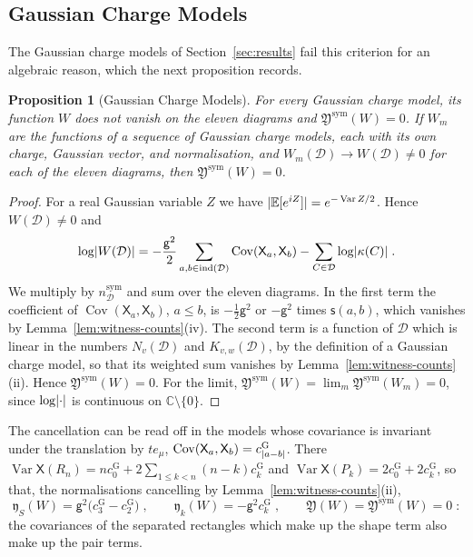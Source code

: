 \documentclass[11pt]{preprint}
\DeclarePairedDelimiter{\abs}{\lvert}{\rvert}
\numberwithin{equation}{section}
\newtheorem{proposition}[theorem]{Proposition}
\theoremstyle{definition}
\theoremstyle{remark}
\theoremstyle{plain}
\begin{document}
\subsection{Gaussian Charge Models}\label{sec:gaussian-models}

The Gaussian charge models of Section~\ref{sec:results} fail this criterion for an algebraic reason, which the next proposition records.

\begin{proposition}[Gaussian Charge Models]\label{prop:gaussian-models}
For every Gaussian charge model, its function $W$ does not vanish on the eleven diagrams and $\mathfrak Y^{\mathrm{sym}}(W) = 0$. If $W_m$ are the functions of a sequence of Gaussian charge models, each with its own charge, Gaussian vector, and normalisation, and $W_m(\mathcal D) \to W(\mathcal D) \neq 0$ for each of the eleven diagrams, then $\mathfrak Y^{\mathrm{sym}}(W) = 0$.
\end{proposition}

\begin{proof}
For a real Gaussian variable $Z$ we have $\abs{\mathbb E[e^{iZ}]} = e^{-\operatorname{Var}Z/2}$. Hence $W(\mathcal D) \neq 0$ and
\begin{equation}\label{eq:gaussian-log}
    \log\abs{W(\mathcal D)} = -\frac{\mathsf g^2}{2}\sum_{a,b \in \operatorname{ind}(\mathcal D)}\operatorname{Cov}(\mathsf X_a, \mathsf X_b) - \sum_{C \in \mathcal D}\log\abs{\kappa(C)}\;.
\end{equation}
We multiply by $n^{\mathrm{sym}}_{\mathcal D}$ and sum over the eleven diagrams. In the first term the coefficient of $\operatorname{Cov}(\mathsf X_a, \mathsf X_b)$, $a \leq b$, is $-\frac12\mathsf g^2$ or $-\mathsf g^2$ times $\mathsf s(a, b)$, which vanishes by Lemma~\ref{lem:witness-counts}(iv). The second term is a function of $\mathcal D$ which is linear in the numbers $N_v(\mathcal D)$ and $K_{v,w}(\mathcal D)$, by the definition of a Gaussian charge model, so that its weighted sum vanishes by Lemma~\ref{lem:witness-counts}(ii). Hence $\mathfrak Y^{\mathrm{sym}}(W) = 0$. For the limit, $\mathfrak Y^{\mathrm{sym}}(W) = \lim_m\mathfrak Y^{\mathrm{sym}}(W_m) = 0$, since $\log\abs{\cdot}$ is continuous on $\mathbb C \setminus \{ 0 \}$.
\end{proof}

The cancellation can be read off in the models whose covariance is invariant under the translation by $te_\mu$, $\operatorname{Cov}(\mathsf X_a, \mathsf X_b) = c^{\mathrm G}_{\abs{a-b}}$. There $\operatorname{Var}\mathsf X(R_n) = nc^{\mathrm G}_0 + 2\sum_{1 \leq k < n}(n - k)c^{\mathrm G}_k$ and $\operatorname{Var}\mathsf X(P_k) = 2c^{\mathrm G}_0 + 2c^{\mathrm G}_k$, so that, the normalisations cancelling by Lemma~\ref{lem:witness-counts}(ii),
\begin{equation}\label{eq:stationary-gaussian}
    \mathfrak y_S(W) = \mathsf g^2\bigl(c^{\mathrm G}_3 - c^{\mathrm G}_2\bigr)\;,
    \qquad
    \mathfrak y_k(W) = -\mathsf g^2c^{\mathrm G}_k\;,
    \qquad
    \mathfrak Y(W) = \mathfrak Y^{\mathrm{sym}}(W) = 0\;:
\end{equation}
the covariances of the separated rectangles which make up the shape term also make up the pair terms.
\end{document}
